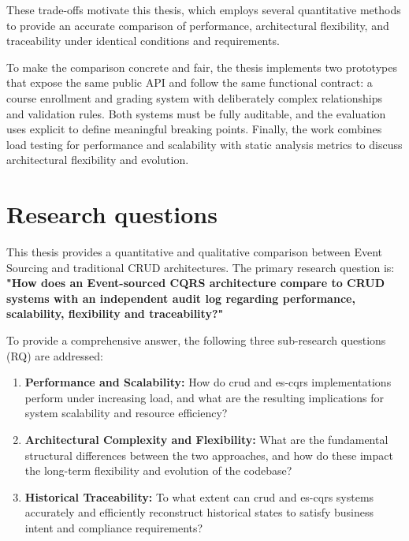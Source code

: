These trade-offs motivate this thesis, which employs several quantitative methods to provide an accurate comparison of performance, architectural flexibility, and traceability under identical conditions and requirements.

To make the comparison concrete and fair, the thesis implements two prototypes that expose the same public API and follow the same functional contract: a course enrollment and grading system with deliberately complex relationships and validation rules. Both systems must be fully auditable, and the evaluation uses explicit  to define meaningful breaking points. Finally, the work combines load testing for performance and scalability with static analysis metrics to discuss architectural flexibility and evolution.

\section{Research questions}

This thesis provides a quantitative and qualitative comparison between Event Sourcing and traditional CRUD architectures. The primary research question is: \textbf{"How does an Event-sourced CQRS architecture compare to CRUD systems with an independent audit log regarding performance, scalability, flexibility and traceability?"}

To provide a comprehensive answer, the following three sub-research questions (RQ) are addressed:

\begin{enumerate}[label={RQ \arabic*}]
    \item \textbf{Performance and Scalability:} How do \acrshort{crud} and \acrshort{es}-\acrshort{cqrs} implementations perform under increasing load, and what are the resulting implications for system scalability and resource efficiency? \label{rs-performance-scalability}
    \item \textbf{Architectural Complexity and Flexibility:} What are the fundamental structural differences between the two approaches, and how do these impact the long-term flexibility and evolution of the codebase? \label{rs-architecture}
    \item \textbf{Historical Traceability:} To what extent can \acrshort{crud} and \acrshort{es}-\acrshort{cqrs} systems accurately and efficiently reconstruct historical states to satisfy business intent and compliance requirements? \label{rs-traceability}
\end{enumerate}

